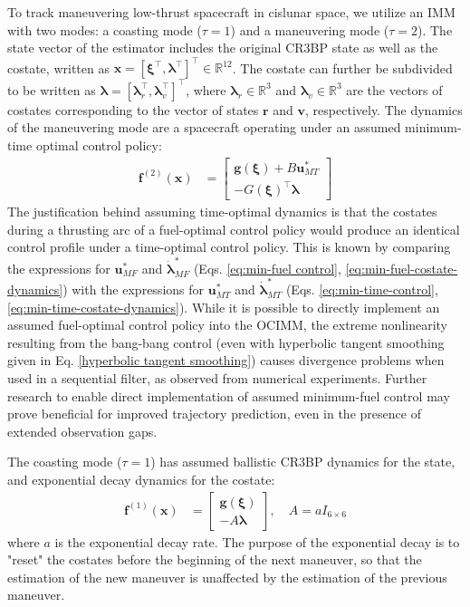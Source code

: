\documentclass[letterpaper, preprint, paper,11pt]{AAS}	%
\newcommand{\R}{\mathbb{R}}
\begin{document}
To track maneuvering low-thrust spacecraft in cislunar space, we utilize an IMM with two modes: a coasting mode ($\tau=1$) and a maneuvering mode ($\tau=2$). The state vector of the estimator includes the original CR3BP state as well as the costate, written as $\bm{x} = [\bm{\xi}^\top, \bm{\lambda}^\top]^\top \in \R^{12}$. The costate can further be subdivided to be written as $\bm{\lambda} = [\bm{\lambda}_r^\top, \bm{\lambda}_v^\top]^\top$, where $\bm{\lambda}_r \in \R^3$ and $\bm{\lambda}_v \in \R^3$ are the vectors of costates corresponding to the vector of states $\bm{r}$ and $\bm{v}$, respectively. The dynamics of the maneuvering mode are a spacecraft operating under an assumed minimum-time optimal control policy:
\begin{align}
    \bm{f}^{(2)}(\bm{x}) &= \begin{bmatrix}
        \bm{g}(\bm{\xi}) + B \bm{u}^*_{MT} \\
        -G(\bm{\xi})^\top \bm{\lambda}
    \end{bmatrix}
\end{align}
The justification behind assuming time-optimal dynamics is that the costates during a thrusting arc of a fuel-optimal control policy would produce an identical control profile under a time-optimal control policy. This is known by comparing the expressions for $\bm{u}^*_{MF}$ and $\dot{\bm{\lambda}}_{MF}^*$ (Eqs. \ref{eq:min-fuel control}, \ref{eq:min-fuel-costate-dynamics}) with the expressions for $\bm{u}^*_{MT}$ and $\dot{\bm{\lambda}}_{MT}^*$ (Eqs. \ref{eq:min-time-control}, \ref{eq:min-time-costate-dynamics}). While it is possible to directly implement an assumed fuel-optimal control policy into the OCIMM, the extreme nonlinearity resulting from the bang-bang control (even with hyperbolic tangent smoothing given in Eq. \ref{hyperbolic tangent smoothing}) causes divergence problems when used in a sequential filter, as observed from numerical experiments. Further research to enable direct implementation of assumed minimum-fuel control may prove beneficial for improved trajectory prediction, even in the presence of extended observation gaps. 

The coasting mode ($\tau=1$) has assumed ballistic CR3BP dynamics for the state, and exponential decay dynamics for the costate:
\begin{align}
    \bm{f}^{(1)}(\bm{x}) &= \begin{bmatrix}
        \bm{g}(\bm{\xi}) \\
        -A \bm{\lambda}
    \end{bmatrix}, \quad A = aI_{6 \times 6} \label{eq:OCIMM-coasting-dynamics}
\end{align}
\noindent where $a$ is the exponential decay rate. The purpose of the exponential decay is to "reset" the costates before the beginning of the next maneuver, so that the estimation of the new maneuver is unaffected by the estimation of the previous maneuver.
\end{document}
